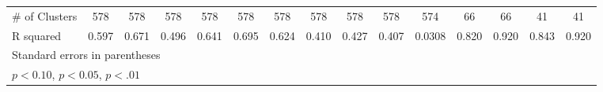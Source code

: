 \begin{table}[htbp]
\begin{tabular}{l*{14}{c}}
\# of Clusters      &         578         &         578         &         578         &         578         &         578         &         578         &         578         &         578         &         578         &         574         &          66         &          66         &          41         &          41         \\
R squared           &       0.597         &       0.671         &       0.496         &       0.641         &       0.695         &       0.624         &       0.410         &       0.427         &       0.407         &      0.0308         &       0.820         &       0.920         &       0.843         &       0.920         \\
\hline\hline
\multicolumn{15}{l}{\footnotesize Standard errors in parentheses}\\
\multicolumn{15}{l}{\footnotesize \sym{*} \(p<0.10\), \sym{**} \(p<0.05\), \sym{***} \(p<.01\)}\\
\end{tabular}
\end{table}
